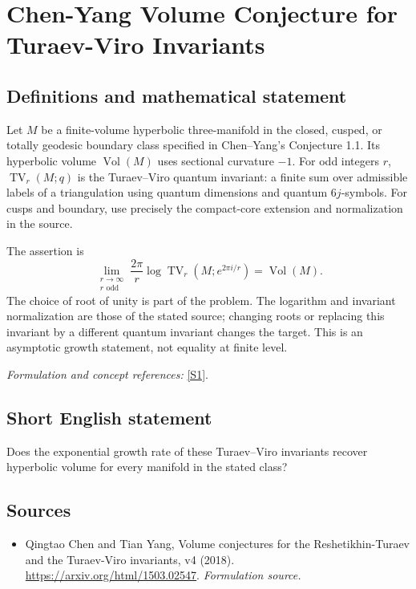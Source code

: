 \documentclass[11pt]{article}
\begin{document}
\section*{\texorpdfstring{Chen-Yang Volume Conjecture for Turaev-Viro Invariants}{Chen-Yang Volume Conjecture for Turaev-Viro Invariants}}\label{30006929}
\subsection{Definitions and mathematical statement}
Let $M$ be a finite-volume hyperbolic three-manifold in the closed, cusped, or totally geodesic boundary class specified in Chen--Yang's Conjecture 1.1. Its hyperbolic volume $\operatorname{Vol}(M)$ uses sectional curvature $-1$. For odd integers $r$, $\operatorname{TV}_r(M;q)$ is the Turaev--Viro quantum invariant: a finite sum over admissible labels of a triangulation using quantum dimensions and quantum $6j$-symbols. For cusps and boundary, use precisely the compact-core extension and normalization in the source.

The assertion is
\[
 \lim_{\substack{r\to\infty\\r\text{ odd}}}
 \frac{2\pi}{r}\log\operatorname{TV}_r(M;e^{2\pi i/r})
 =\operatorname{Vol}(M).
\]
The choice of root of unity is part of the problem. The logarithm and invariant normalization are those of the stated source; changing roots or replacing this invariant by a different quantum invariant changes the target. This is an asymptotic growth statement, not equality at finite level.
\par\smallskip\textit{Formulation and concept references:} \href{https://arxiv.org/html/1503.02547}{[S1]}.

\subsection{Short English statement}
Does the exponential growth rate of these Turaev--Viro invariants recover hyperbolic volume for every manifold in the stated class?
\subsection{Sources}
\begin{itemize}
\item[S1]Qingtao Chen and Tian Yang, Volume conjectures for the Reshetikhin-Turaev and the Turaev-Viro invariants, v4 (2018).
\url{https://arxiv.org/html/1503.02547}.
\textit{Formulation source.}
\end{itemize}
\end{document}
